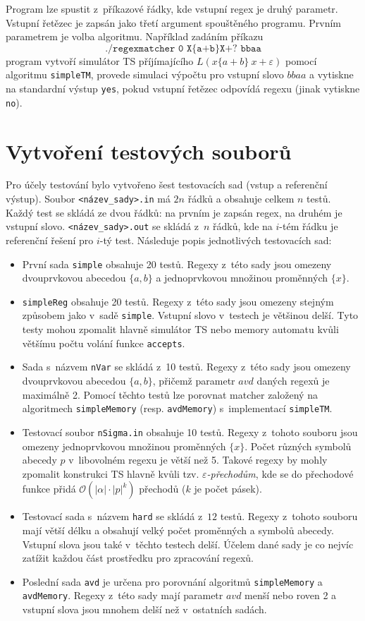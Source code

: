 \documentclass[thesis=B,czech]{FITthesis}[2019/12/23]
\theoremstyle{definition}
\begin{document}
Program lze spustit z~příkazové řádky, kde vstupní regex je druhý parametr. Vstupní řetězec je zapsán jako třetí argument spouštěného programu. Prvním parametrem je volba algoritmu. Například zadáním příkazu $$\texttt{./regexmatcher 0 X\{a+b\}X+? bbaa}$$ program vytvoří simulátor TS příjímajícího ${L(x\{a+b\}\ x+\varepsilon)}$ pomocí algoritmu \texttt{simpleTM}, provede simulaci výpočtu pro vstupní slovo $bbaa$ a vytiskne na standardní výstup \texttt{yes}, pokud vstupní řetězec odpovídá regexu (jinak vytiskne \texttt{no}).

\section{Vytvoření testových souborů}
Pro účely testování bylo vytvořeno šest testovacích sad (vstup a referenční výstup). Soubor \texttt{<název\_sady>.in} má $2n$ řádků a obsahuje celkem $n$ testů. Každý test se skládá ze dvou řádků: na prvním je zapsán regex, na druhém je vstupní slovo. \texttt{<název\_sady>.out} se skládá z~$n$ řádků, kde na $i$-tém řádku je referenční řešení pro $i$-tý test. Následuje popis jednotlivých testovacích sad:
\begin{itemize}
	\item{První sada \texttt{simple} obsahuje 20 testů. Regexy z~této sady jsou omezeny dvouprvkovou abecedou $\{a, b\}$ a jednoprvkovou množinou proměnných $\{x\}$.}
	\item{\texttt{simpleReg} obsahuje 20 testů. Regexy z~této sady jsou omezeny stejným způsobem jako v~sadě \texttt{simple}. Vstupní slovo v~testech je většinou delší. Tyto testy mohou zpomalit hlavně simulátor TS nebo memory automatu kvůli většímu počtu volání funkce \texttt{accepts}. }
	\item{Sada s~názvem \texttt{nVar} se skládá z~10 testů. Regexy z~této sady jsou omezeny dvouprvkovou abecedou $\{a, b\}$, přičemž parametr $avd$ daných regexů je maximálně 2. Pomocí těchto testů lze porovnat matcher založený na algoritmech \texttt{simpleMemory} (resp. \texttt{avdMemory}) s~implementací \texttt{simpleTM}.}
	\item{Testovací soubor \texttt{nSigma.in} obsahuje 10 testů. Regexy z~tohoto souboru jsou omezeny jednoprvkovou množinou proměnných $\{x\}$. Počet různých symbolů abecedy $p$ v~libovolném regexu je větší než 5. Takové regexy by mohly zpomalit konstrukci TS hlavně kvůli tzv. \emph{$\varepsilon$-přechodům}, kde se do přechodové funkce přidá $\mathcal{O}(|\alpha|\cdot|p|^{k})$ přechodů ($k$ je počet pásek). }
	\item{Testovací sada s~názvem \texttt{hard} se skládá z~$12$ testů. Regexy z~tohoto souboru mají větší délku a obsahují velký počet proměnných a symbolů abecedy. Vstupní slova jsou také v~těchto testech delší. Účelem dané sady je co nejvíc zatížit každou část prostředku pro zpracování regexů.}
	\item{Poslední sada \texttt{avd} je určena pro porovnání algoritmů \texttt{simpleMemory} a \texttt{avdMemory}. Regexy z~této sady mají parametr $avd$ menší nebo roven 2 a vstupní slova jsou mnohem delší než v~ostatních sadách.}
\end{itemize}
\end{document}

